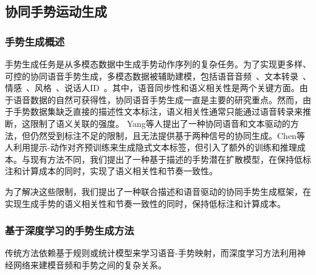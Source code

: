 


\subsection{协同手势运动生成}

\subsubsection{手势生成概述}
手势生成任务是从多模态数据中生成手势动作序列的复杂任务。为了实现更多样、可控的协同语音手势生成，多模态数据被辅助建模，包括语音音频~\cite{yang2023diffusestylegesture, yang2023unifiedgesture,xu2025mambatalk}、文本转录~\cite{zhi2023livelyspeaker, pang2023bodyformer,liu2024emage}、情感~\cite{qi2024emotiongesture, qi2024weakly}、风格~\cite{ao2023gesturediffuclip, yang2023diffusestylegesture, ghorbani2023zeroeggs}、说话人ID~\cite{yang2023diffusestylegesture+}。其中，语音同步性和语义相关性是两个关键方面。由于语音数据的自然可获得性，协同语音手势生成一直是主要的研究重点。然而，由于手势数据集缺乏直接的描述性文本标注，语义相关性通常只能通过语音转录来推断，这限制了语义关联的强度。
Yang等人\cite{yang2024freetalker}提出了一种协同语音和文本驱动的方法，但仍然受到标注不足的限制，且无法提供基于两种信号的协同生成。Chen等人\cite{chen2024syntalker}利用提示-动作对齐预训练来生成隐式文本标签，但引入了额外的训练和推理成本。与现有方法不同，我们提出了一种基于描述的手势潜在扩散模型，在保持低标注和计算成本的同时，实现了语义相关性和节奏一致性。

为了解决这些限制，我们提出了一种联合描述和语音驱动的协同手势生成框架，在实现生成手势的语义相关性和节奏一致性的同时，保持低标注和计算成本。

\subsubsection{基于深度学习的手势生成方法}
传统方法依赖基于规则或统计模型来学习语音-手势映射，而深度学习方法利用神经网络来建模音频和手势之间的复杂关系\cite{nyatsanga2023comprehensive}。

